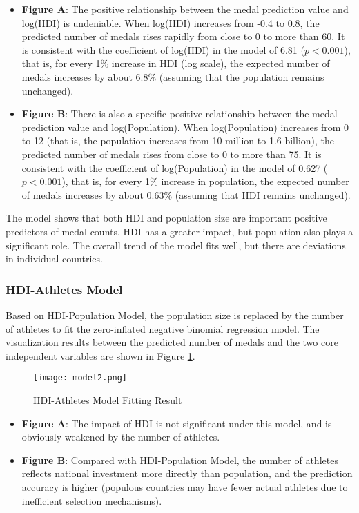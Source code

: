 \documentclass[11pt,twoside]{article}
\numberwithin{Theorem}{section}
\numberwithin{Definition}{section}
\numberwithin{Lemma}{section}
\numberwithin{Algorithm}{section}
\numberwithin{equation}{section}
\begin{document}
\begin{itemize}
    \item \textbf{Figure A}: The positive relationship between the medal prediction value and log(HDI) is undeniable. When log(HDI) increases from -0.4 to 0.8, the predicted number of medals rises rapidly from close to 0 to more than 60. It is consistent with the coefficient of log(HDI) in the model of 6.81 ($p<0.001$), that is, for every 1\% increase in HDI (log scale), the expected number of medals increases by about 6.8\% (assuming that the population remains unchanged).
    
    \item \textbf{Figure B}: There is also a specific positive relationship between the medal prediction value and log(Population). When log(Population) increases from 0 to 12 (that is, the population increases from 10 million to 1.6 billion), the predicted number of medals rises from close to 0 to more than 75. It is consistent with the coefficient of log(Population) in the model of 0.627 ($p<0.001$), that is, for every 1\% increase in population, the expected number of medals increases by about 0.63\% (assuming that HDI remains unchanged).
\end{itemize}

The model shows that both HDI and population size are important positive predictors of medal counts. HDI has a greater impact, but population also plays a significant role. The overall trend of the model fits well, but there are deviations in individual countries.

\subsubsection{HDI-Athletes Model}

Based on HDI-Population Model, the population size is replaced by the number of athletes to fit the zero-inflated negative binomial regression model. The visualization results between the predicted number of medals and the two core independent variables are shown in Figure \ref{fig:model2}.

\begin{figure}[!ht]
\centering
\texttt{[image: model2.png]}
\caption{HDI-Athletes Model Fitting Result}
\label{fig:model2}
\end{figure}

\begin{itemize}
    \item \textbf{Figure A}: The impact of HDI is not significant under this model, and is obviously weakened by the number of athletes.
    
    \item \textbf{Figure B}: Compared with HDI-Population Model, the number of athletes reflects national investment more directly than population, and the prediction accuracy is higher (populous countries may have fewer actual athletes due to inefficient selection mechanisms).
\end{itemize}
\end{document}
